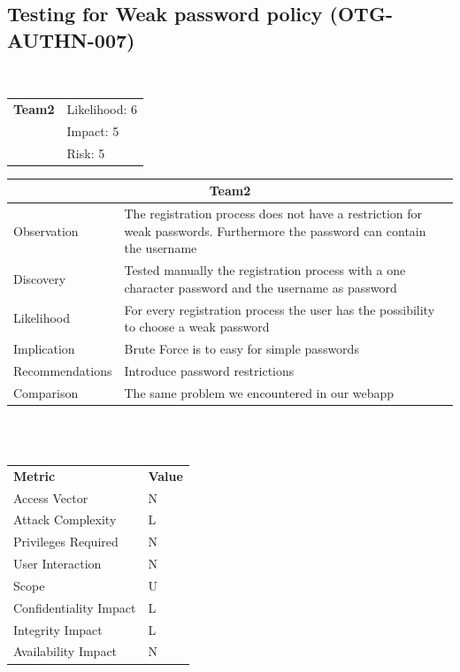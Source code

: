 \documentclass[headsepline,footsepline,footinclude=false,oneside,fontsize=11pt,paper=a4,listof=totoc,bibliography=totoc]{scrbook} %
\begin{document}
\pagebreak
\subsection{Testing for Weak password policy (OTG-AUTHN-007)}\

\begin{tabular}{cR{12cm}}
	\textbf{Team2} & Likelihood: 6\\& Impact: 5\\& Risk: 5
\end{tabular}

\begin{tabular}{ l|p{11cm}  }
	\hline
	\multicolumn{2}{c}{\textbf{Team2}} \\
	\hline
	Observation & The registration process does not have a restriction for weak passwords. Furthermore the password can contain the username\\
	Discovery & Tested manually the registration process with a one character password and the username as password\\
	Likelihood & For every registration process the user has the possibility to choose a weak password\\
	Implication & Brute Force is to easy for simple passwords\\
	Recommendations & Introduce password restrictions\\
	Comparison & The same problem we encountered in our webapp \\
	\hline
\end{tabular}
\\
\vspace{0.5cm}
\\
\begin{center}
	\begin{tabular}{ll}
		\rowcolor[HTML]{34CDF9}
		{\color[HTML]{ECF4FF} \textbf{Metric}}        & {\color[HTML]{ECF4FF} \textbf{Value}} \\
		\rowcolor[HTML]{BBDAFF}
		{\color[HTML]{333333} Access Vector}          & {\color[HTML]{333333} } N              \\
		\rowcolor[HTML]{ECF4FF}
		{\color[HTML]{333333} Attack Complexity}      & {\color[HTML]{333333} } L              \\
		\rowcolor[HTML]{BBDAFF}
		{\color[HTML]{333333} Privileges Required}    & {\color[HTML]{333333} } N              \\
		\rowcolor[HTML]{ECF4FF}
		{\color[HTML]{333333} User Interaction}       & {\color[HTML]{333333} } N              \\
		\rowcolor[HTML]{BBDAFF}
		{\color[HTML]{333333} Scope}                  & {\color[HTML]{333333} } U              \\
		\rowcolor[HTML]{ECF4FF}
		{\color[HTML]{333333} Confidentiality Impact} & {\color[HTML]{333333} } L              \\
		\rowcolor[HTML]{BBDAFF}
		{\color[HTML]{333333} Integrity Impact}       & {\color[HTML]{333333} } L              \\
		\rowcolor[HTML]{ECF4FF}
		{\color[HTML]{333333} Availability Impact}    & {\color[HTML]{333333} } N
	\end{tabular}
\end{center}
\end{document}
